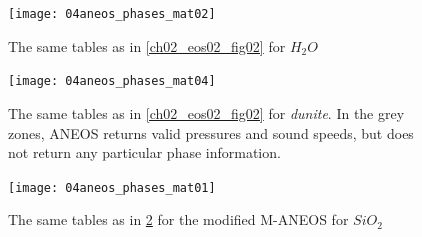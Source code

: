 \begin{figure}
\begin{center}
\texttt{[image: 04aneos\_phases\_mat02]}
\caption{The same tables as in \ref{ch02_eos02_fig02} for $H_2 O$ }
\label{ch02_eos02_fig03}
\end{center}
\end{figure}


\begin{figure}
\begin{center}
\texttt{[image: 04aneos\_phases\_mat04]}
\caption{The same tables as in \ref{ch02_eos02_fig02} for \emph{dunite}. In the grey zones, ANEOS returns valid pressures and sound speeds, but does not return any particular phase information.}
\label{ch02_eos02_fig04}
\end{center}
\end{figure}



\begin{figure}
\begin{center}
\texttt{[image: 04aneos\_phases\_mat01]}
\caption{The same tables as in \ref{ch02_eos02_fig04} for the modified M-ANEOS for $SiO_2$}
\label{ch02_eos02_fig05}
\end{center}
\end{figure}

